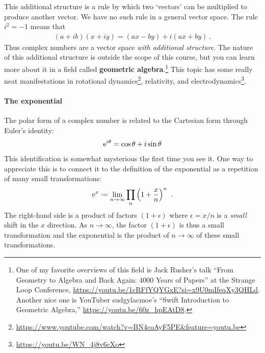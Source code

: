 This additional structure is a rule by which two `vectors' can be multiplied to produce another vector. We have no such rule in a general vector space. The rule $i^2 = -1$ means that
\begin{align}
    (a+ib)(x+iy) = (ax - by) + i (ax + by) \ .
\end{align}
Thus complex numbers are a vector space \emph{with additional structure}. The nature of this additional structure is outside the scope of this course, but you can learn more about it in a field called \textbf{geometric algebra}.\footnote{One of my favorite overviews of this field is Jack Rusher's talk ``From Geometry to Algebra and Back Again: 4000 Years of Papers'' at the Strange Loop Conference, \url{https://youtu.be/1cRFfYQYGxE?si=x9U0mIfeqXy3QHLd}. Another nice one is YouTuber sudgylacmoe's ``Swift Introduction to Geometric Algebra,'' \url{https://youtu.be/60z_hpEAtD8}.}\autocite{Doran:2007tqa} This topic has some really neat manifestations in rotational dynamics\footnote{\url{https://www.youtube.com/watch?v=BN4coAyF5PE&feature=youtu.be}}\autocite{10.1119/5.0109883}, relativity\autocite{10.1119/1.4734014}, and electrodynamics\footnote{\url{https://youtu.be/WN_4j8v6cXo}}\autocite{Dressel:2014fna}.

\paragraph{The exponential}
The polar form of a complex number is related to the Cartesian form through Euler's identity:
\begin{align}
    \operatorname{e}^{i\theta} = \cos\theta + i\sin\theta
\end{align}
This identification is somewhat mysterious the first time you see it. One way to appreciate this is to connect it to the definition of the exponential as a repetition of many small transformations:
\begin{align}
    \e^x \defeq \lim_{n\to\infty} 
    \prod _n \left(1+\frac{x}{n}\right)^n \ .
\end{align}
The right-hand side is a product of factors $(1+\epsilon)$ where $\epsilon = x/n$ is a \emph{small} shift in the $x$ direction. As $n\to\infty$, the factor $(1+\epsilon)$ is thus a small transformation and the exponential is the product of $n\to\infty$ of these small transformations. 

